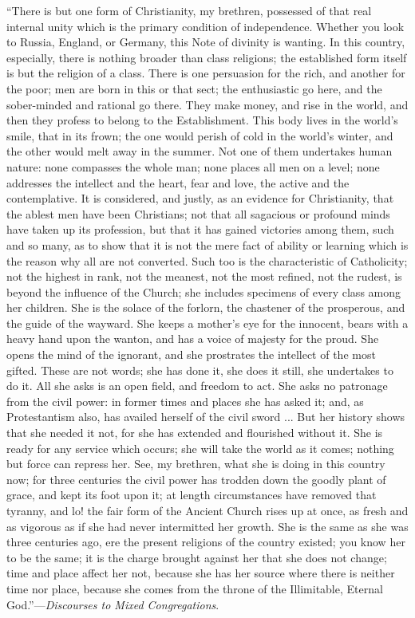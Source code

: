``There is but one form of Christianity, my
brethren, possessed of that real internal unity which is the primary
condition of independence. Whether you look to Russia, England, or
Germany, this Note of divinity is wanting. In this country,
especially, there is nothing broader than class religions; the
established form itself is but the religion of a class. There is one
persuasion for the rich, and another for the poor; men are born in
this or that sect; the enthusiastic go here, and the sober-minded and
rational go there. They make money, and rise in the world, and then
they profess to belong to the Establishment. This body lives in the
world's smile, that in its frown; the one would perish of cold in the
world's winter, and the other would melt away in the summer. Not one
of them undertakes human nature: none compasses the whole man; none
places all men on a level; none addresses the intellect and the heart,
fear and love, the active and the contemplative. It is considered, and
justly, as an evidence for Christianity, that the ablest men have been
Christians; not that all sagacious or profound minds have taken up its
profession, but that it has gained victories among them, such and so
many, as to show that it is not the mere fact of ability or learning
which is the reason why all are not converted. Such too is the
characteristic of Catholicity; not the highest in rank, not the
meanest, not the most refined, not the rudest, is beyond the influence
of the Church; she includes specimens of every class among her
children. She is the solace of the forlorn, the chastener of the prosperous, and the guide of the wayward. She keeps a mother's eye for
the innocent, bears with a heavy hand upon the wanton, and has a voice
of majesty for the proud. She opens the mind of the ignorant, and she
prostrates the intellect of the most gifted. These are not words; she
has done it, she does it still, she undertakes to do it. All she asks
is an open field, and freedom to act. She asks no patronage from the
civil power: in former times and places she has asked it; and, as
Protestantism also, has availed herself of the civil sword ... But her
history shows that she needed it not, for she has extended and
flourished without it. She is ready for any service which occurs; she
will take the world as it comes; nothing but force can repress her.
See, my brethren, what she is doing in this country now; for three
centuries the civil power has trodden down the goodly plant of grace,
and kept its foot upon it; at length circumstances have removed that
tyranny, and lo! the fair form of the Ancient Church rises up at once,
as fresh and as vigorous as if she had never intermitted her growth.
She is the same as she was three centuries ago, ere the present
religions of the country existed; you know her to be the same; it is
the charge brought against her that she does not change; time and
place affect her not, because she has her source where there is
neither time nor place, because she comes from the throne of the
Illimitable, Eternal God.''—\emph{Discourses to Mixed Congregations}.

